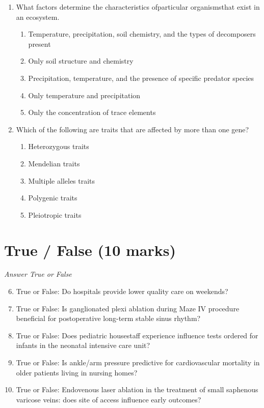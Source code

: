\documentclass[12pt]{article}
\begin{document}
\begin{enumerate}[label=\arabic*.]
\begin{enumerate}[label=(\alph*)]
\end{enumerate}
\item What factors determine the characteristics ofparticular organismsthat exist in an ecosystem.
\begin{enumerate}[label=(\alph*)]
    \item Temperature, precipitation, soil chemistry, and the types of decomposers present
    \item Only soil structure and chemistry
    \item Precipitation, temperature, and the presence of specific predator species
    \item Only temperature and precipitation
    \item Only the concentration of trace elements
\end{enumerate}
\item Which of the following are traits that are affected by more than one gene?
\begin{enumerate}[label=(\alph*)]
    \item Heterozygous traits
    \item Mendelian traits
    \item Multiple alleles traits
    \item Polygenic traits
    \item Pleiotropic traits
\end{enumerate}
\end{enumerate}

\section*{True / False (10 marks)}
\textit{Answer True or False}
\begin{enumerate}[label=\arabic*.]
\setcounter{enumi}{5}
\item True or False: Do hospitals provide lower quality care on weekends?
\item True or False: Is ganglionated plexi ablation during Maze IV procedure beneficial for postoperative long-term stable sinus rhythm?
\item True or False: Does pediatric housestaff experience influence tests ordered for infants in the neonatal intensive care unit?
\item True or False: Is ankle/arm pressure predictive for cardiovascular mortality in older patients living in nursing homes?
\item True or False: Endovenous laser ablation in the treatment of small saphenous varicose veins: does site of access influence early outcomes?
\end{enumerate}
\end{document}
